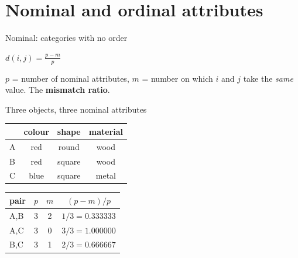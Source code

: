 \documentclass[aspectratio=169]{beamer}
\begin{document}
\section[Nominal, ordinal]{Nominal and ordinal attributes}
\label{sec:nomord}

\begin{frame}{Nominal: categories with no order}
  \begin{exampleblock}{}
    \centering\large
    $\displaystyle d(i,j) = \frac{p - m}{p}$
  \end{exampleblock}
  \begin{center}
    \small $p$ = number of nominal attributes, $m$ = number on which
    $i$ and $j$ take the \emph{same} value. The \textbf{mismatch ratio}.
  \end{center}
  \vspace{0.2em}
  \begin{exampleblock}{Three objects, three nominal attributes}
    \small
    \begin{tabular}{lccc}
      \toprule
      & colour & shape & material \\ \midrule
      A & red & round & wood \\
      B & red & square & wood \\
      C & blue & square & metal \\ \bottomrule
    \end{tabular}
    \qquad
    \begin{tabular}{lccc}
      \toprule
      pair & $p$ & $m$ & $(p-m)/p$ \\ \midrule
      A,B & 3 & 2 & $1/3 = 0.333333$ \\
      A,C & 3 & 0 & $3/3 = 1.000000$ \\
      B,C & 3 & 1 & $2/3 = 0.666667$ \\ \bottomrule
    \end{tabular}
  \end{exampleblock}
\end{frame}
\end{document}

